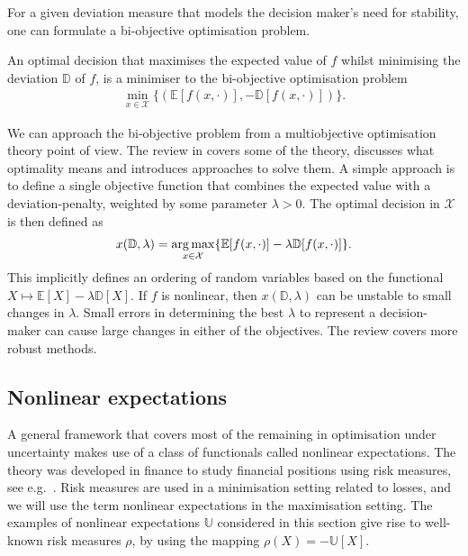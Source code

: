 \documentclass[main.tex]{subfiles}
\begin{document}
For a given deviation measure that models the decision maker's
need for stability, one can formulate a bi-objective optimisation
problem.
\begin{problem}
  An optimal decision that maximises the expected value of $f$ whilst
  minimising the deviation $\mathbb D$ of $f$, is a minimiser to the
  bi-objective optimisation problem
  \begin{align}
    \min_{x\in\mathcal{X}}\{(\mathbb E[f(x,\cdot)],-\mathbb D[f(x,\cdot)])\}.
  \end{align}
\end{problem}
We can approach the bi-objective problem from a multiobjective
optimisation theory point of view.
The review in \citep{marler2004survey} covers some of the theory,
discusses what optimality means and introduces approaches to solve them.
A simple approach is to define a single objective function that combines
the expected value with a deviation-penalty, weighted by some
parameter $\lambda>0$. The optimal decision in $\mathcal{X}$ is then
defined as
\begin{align}
  x(\mathbb D,\lambda)=\operatorname*{arg\,max}_{x\in\mathcal{X}}\{\mathbb
  E[f(x,\cdot)]-\lambda \mathbb D[f(x,\cdot)]\}.
\end{align}
This implicitly defines an ordering of random variables based on
the functional $X\mapsto \mathbb{E}[X]-\lambda \mathbb{D}[X]$.
If $f$ is nonlinear, then $x(\mathbb D,\lambda)$ can be unstable to
small changes in $\lambda$. Small errors in determining the best
$\lambda$ to represent a decision-maker can cause large changes in
either of the objectives. The review \citep{marler2004survey} covers
more robust methods.

\subsection{Nonlinear expectations}\label{sec:nonlinear_expectations}
A general framework that covers most of the remaining
in optimisation under uncertainty makes use of a class of functionals
called nonlinear expectations.
The theory was developed in finance to study financial positions using
risk measures, see
e.g.~\citep[Ch.~4]{follmer2004stochastic}.
Risk measures are used in a minimisation setting related to losses,
and we will use the term nonlinear expectations in the maximisation
setting. The examples of nonlinear expectations $\mathbb U$ considered
in this section give rise to well-known risk measures $\rho$, by using the mapping
$\rho(X) = -\mathbb U[X]$.
\end{document}
